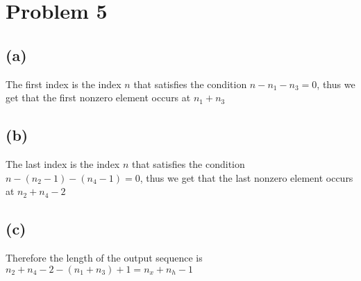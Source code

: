 \section*{Problem 5}
\subsection*{(a)}
The first index is the index $n$ that satisfies the condition 
$n-n_1-n_3=0$, thus we get that the first nonzero element occurs at $\boxed{n_1+n_3}$
\subsection*{(b)}
The last index is the index $n$ that satisfies the condition
$n-(n_2-1)-(n_4-1)=0$, thus we get that the last nonzero element occurs at $\boxed{n_2+n_4-2}$
\subsection*{(c)}
Therefore the length of the output sequence is 
$n_2+n_4-2-(n_1+n_3)+1=\boxed{n_x+n_h-1}$






